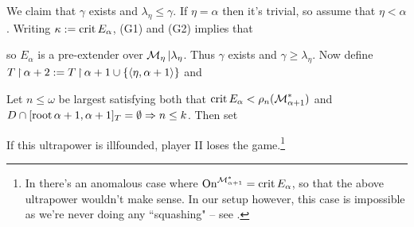 \qquad We claim that $\gamma$ exists and $\lambda_\eta\leq\gamma$. If $\eta=\alpha$ then it's trivial, so assume that $\eta<\alpha$. Writing $\kappa:=\operatorname{crit} E_\alpha$, (G1) and (G2) implies that
\eq{
\P(\kappa)\cap\M_\eta|\lambda_\eta=\P(\kappa)\cap\M_\alpha|\lambda_\eta=\P(\kappa)\cap\M_\alpha,
}

so $E_\alpha$ is a pre-extender over $\operatorname{\mathcal{M}}_\eta|\lambda_\eta$. Thus $\gamma$ exists and $\gamma\geq\lambda_\eta$. Now define $T\operatorname{\upharpoonright}\alpha+2:=T\operatorname{\upharpoonright}\alpha+1\cup\{\langle \eta,\alpha+1\rangle\}$ and

Let $n\leq\omega$ be largest satisfying both that $\operatorname{crit} E_\alpha<\rho_n(\operatorname{\mathcal{M}}_{\alpha+1}^*)$ and $D\cap[\operatorname{root}\alpha+1,\alpha+1]_T=\emptyset\Rightarrow n\leq k$. Then set

If this ultrapower is illfounded, player II loses the game.\footnote{In \cite{OIMT} there's an anomalous case where $\operatorname{On}^{\operatorname{\mathcal{M}}_{\alpha+1}^*}=\operatorname{crit} E_\alpha$, so that the above ultrapower wouldn't make sense. In our setup however, this case is impossible as we're never doing any ``squashing" -- see \cite[Chapter 3]{FSIT}.}

